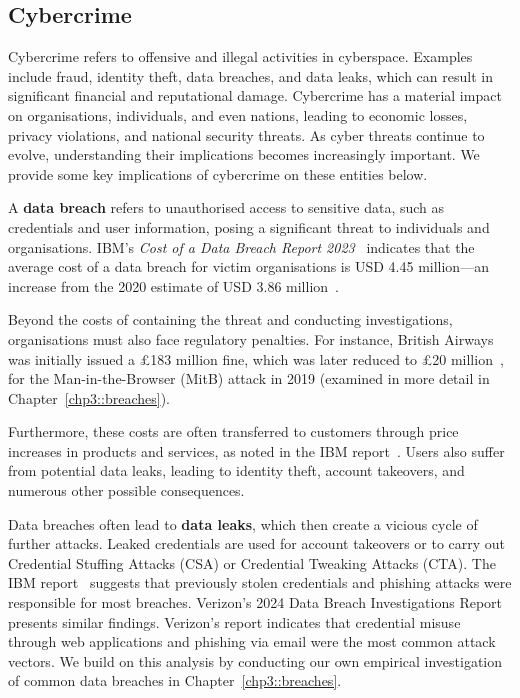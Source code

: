 \subsection{Cybercrime}
Cybercrime refers to offensive and illegal activities in cyberspace. Examples include fraud, identity theft, data breaches, and data leaks, which can result in significant financial and reputational damage. Cybercrime has a material impact on organisations, individuals, and even nations, leading to economic losses, privacy violations, and national security threats. As cyber threats continue to evolve, understanding their implications becomes increasingly important. We provide some key implications of cybercrime on these entities below.

A \textbf{data breach} refers to unauthorised access to sensitive data, such as credentials and user information, posing a significant threat to individuals and organisations. IBM's \textit{Cost of a Data Breach Report 2023}~\cite{ibm_ibm-2023_2023} indicates that the average cost of a data breach for victim organisations is USD 4.45 million—an increase from the 2020 estimate of USD 3.86 million~\cite{ibm_security_ibm-2020_2020}. 

Beyond the costs of containing the threat and conducting investigations, organisations must also face regulatory penalties. For instance, British Airways was initially issued a £183 million fine, which was later reduced to £20 million~\cite{tidy_british_2020}, for the Man-in-the-Browser (MitB) attack in 2019 (examined in more detail in Chapter~\ref{chp3::breaches}). 

Furthermore, these costs are often transferred to customers through price increases in products and services, as noted in the IBM report~\cite{ibm_ibm-2023_2023}. Users also suffer from potential data leaks, leading to identity theft, account takeovers, and numerous other possible consequences.

Data breaches often lead to \textbf{data leaks}, which then create a vicious cycle of further attacks. Leaked credentials are used for account takeovers or to carry out Credential Stuffing Attacks (CSA) or Credential Tweaking Attacks (CTA). The IBM report~\cite{ibm_ibm-2023_2023} suggests that previously stolen credentials and phishing attacks were responsible for most breaches. Verizon's 2024 Data Breach Investigations Report~\cite{verizon_2024_2024} presents similar findings. Verizon's report indicates that credential misuse through web applications and phishing via email were the most common attack vectors. We build on this analysis by conducting our own empirical investigation of common data breaches in Chapter~\ref{chp3::breaches}.

